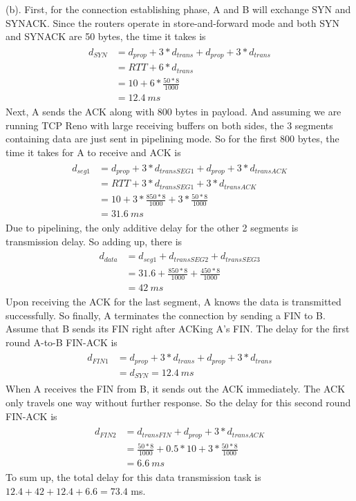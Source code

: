 \documentclass[titlepage, paper=a4, fontsize=11pt]{scrartcl} %
\numberwithin{equation}{section} %
\numberwithin{table}{section} %
\begin{document}
(b).
First, for the connection establishing phase, A and B will exchange SYN and SYNACK. Since the routers operate in store-and-forward mode and both SYN and SYNACK are 50 bytes, the time it takes is
\begin{align*} 
\begin{split}
d_{SYN} &= d_{prop} + 3*d_{trans} + d_{prop} + 3*d_{trans} \\
&= RTT + 6*d_{trans} \\
&= 10 + 6*\frac{50*8}{1000} \\
&=12.4 \ ms
\end{split}					
\end{align*}
Next, A sends the ACK along with 800 bytes in payload. And assuming we are running TCP Reno with large receiving buffers on both sides, the 3 segments containing data are just sent in pipelining mode. So for the first 800 bytes, the time it takes for A to receive and ACK is
\begin{align*} 
\begin{split}
d_{seg1} &= d_{prop} + 3*d_{transSEG1} + d_{prop} + 3*d_{transACK} \\
&= RTT + 3*d_{transSEG1} + 3*d_{transACK} \\
&= 10 + 3*\frac{850*8}{1000} + 3*\frac{50*8}{1000} \\
&= 31.6 \ ms
\end{split}					
\end{align*}
Due to pipelining, the only additive delay for the other 2 segments is transmission delay. So adding up, there is
\begin{align*} 
\begin{split}
d_{data} &= d_{seg1} + d_{transSEG2} + d_{transSEG3} \\
&= 31.6 + \frac{850*8}{1000} + \frac{450*8}{1000} \\
&= 42 \ ms
\end{split}					
\end{align*}
Upon receiving the ACK for the last segment, A knows the data is transmitted successfully. So finally, A terminates the connection by sending a FIN to B. Assume that B sends its FIN right after ACKing A's FIN.
The delay for the first round A-to-B FIN-ACK is
\begin{align*} 
\begin{split}
d_{FIN1} &= d_{prop} + 3*d_{trans} + d_{prop} + 3*d_{trans}  \\
&= d_{SYN} = 12.4 \ ms
\end{split}					
\end{align*}
When A receives the FIN from B, it sends out the ACK immediately. The ACK only travels one way without further response. So the delay for this second round FIN-ACK is
\begin{align*} 
\begin{split}
d_{FIN2} &= d_{transFIN} + d_{prop} + 3*d_{transACK}  \\
&= \frac{50*8}{1000} + 0.5*10 +3*\frac{50*8}{1000} \\
&= 6.6 \ ms
\end{split}					
\end{align*}
To sum up, the total delay for this data transmission task is $12.4+42+12.4+6.6=73.4$ ms.
\\
\end{document}
